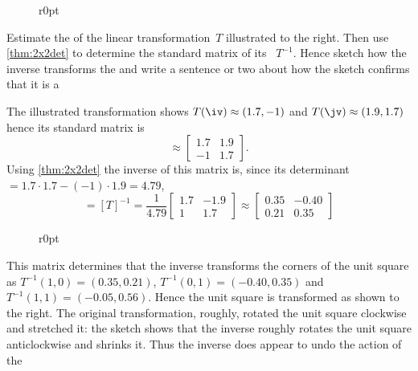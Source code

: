 \begin{figure}r{0pt} 
\end{figure}
\begin{example} 
Estimate the  of the linear transformation~\(T\) illustrated to the right.  
Then use \cref{thm:2x2det} to determine the standard matrix of its 
~\(T^{-1}\).
Hence sketch how the inverse transforms the  and write a sentence or two about how the sketch confirms that it is a 
\begin{solution} 
The illustrated transformation shows \(T(\iv)\approx(1.7,-1)\) and \(T(\jv)\approx(1.9,1.7)\) hence its standard matrix is
\begin{equation*}
[T]\approx\begin{bmatrix} 1.7&1.9\\-1&1.7 \end{bmatrix}.
\end{equation*}
Using \cref{thm:2x2det} the inverse of this matrix is, since its determinant\({}=1.7\cdot1.7-(-1)\cdot1.9=4.79\),
\begin{equation*}
[T^{-1}]=[T]^{-1}
=\frac1{4.79} \begin{bmatrix} 1.7&-1.9\\1&1.7 \end{bmatrix}
\approx\begin{bmatrix} 0.35&-0.40\\0.21&0.35 \end{bmatrix}
\end{equation*}

\begin{figure}r{0pt}
\end{figure}
This matrix determines that the inverse transforms the corners of the unit square as \(T^{-1}(1,0)=(0.35,0.21)\), \(T^{-1}(0,1)=(-0.40,0.35)\) and \(T^{-1}(1,1)=(-0.05,0.56)\).
Hence the unit square is transformed as shown to the right.
The original transformation, roughly, rotated the unit square clockwise and stretched it: the sketch shows that the inverse roughly rotates the unit square anticlockwise and shrinks it.  
Thus the inverse does appear to undo the action of the 
\end{solution}
\end{example}


